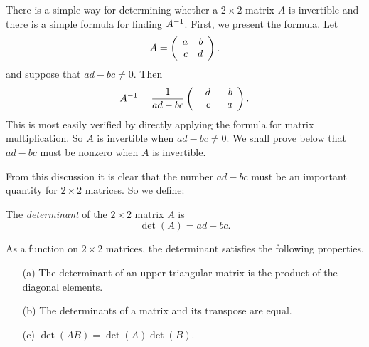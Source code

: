 There is a simple way for determining whether a $2\times 2$ matrix $A$ is
invertible and there is a simple formula for finding $A^{-1}$.
  First, we present the formula.  Let
\[
A=\left(\begin{array}{rr} a & b\\ c &d\end{array}\right).
\]
and suppose that $ad-bc\neq0$.  Then
\begin{equation}  \label{e:formAinv}
A^{-1} = \frac{1}{ad-bc} \left(\begin{array}{rr} d & -b\\ -c &a\end{array}\right).
\end{equation}
This is most easily verified by directly applying the formula for
matrix multiplication.  So $A$ is invertible when $ad-bc\neq 0$. We
shall prove below that $ad-bc$ must be nonzero when $A$ is invertible.

From this discussion it is clear that the number $ad-bc$ must be an
important quantity for $2\times 2$ matrices.  So we define:
\begin{Def}
The {\em determinant\/}  of the $2\times 2$
matrix $A$ is
\begin{equation}  \label{D:determinant}
\det(A) = ad - bc.
\end{equation}
\end{Def}

\begin{prop} \label{propdet}
As a function on $2\times 2$ matrices, the determinant satisfies
the following properties.
\begin{itemize}
\item[(a)] The determinant of an upper triangular matrix is the
product of the diagonal elements. 
\item[(b)] The determinants of a matrix and its transpose are
equal. 
\item[(c)] $\det(AB) = \det(A)\det(B)$.
\end{itemize}
\end{prop}

